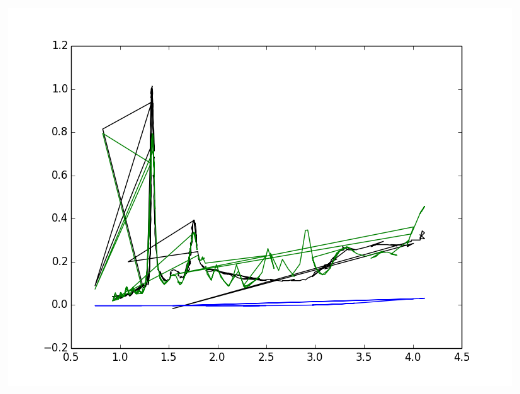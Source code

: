 \documentclass{article}
\begin{document}
\includegraphics{"9,1 - ATPE DNA Paper.png"}
\end{document}
